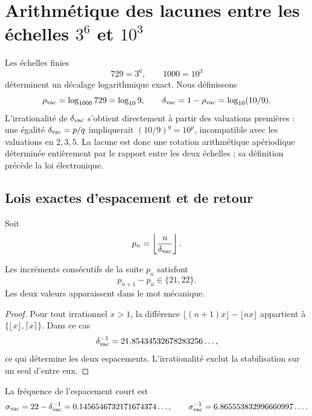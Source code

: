 \section{Arithmétique des lacunes entre les échelles \texorpdfstring{\(3^6\)}{3 élevé à 6} et \texorpdfstring{\(10^3\)}{10 élevé à 3}}
\label{sec:vacancias-corriente-electron-rev11}

Les échelles finies
\[
 729=3^6,
 \qquad
 1000=10^3
\]
déterminent un décalage logarithmique exact. Nous définissons
\begin{equation}
 \rho_{\rm vac}=\log_{1000}729=\log_{10}9,
 \qquad
 \delta_{\rm vac}=1-\rho_{\rm vac}=\log_{10}(10/9).
 \label{eq:delta-vacancias-rev11}
\end{equation}
L'irrationalité de \(\delta_{\rm vac}\) s'obtient directement à partir des
valuations premières : une égalité
\(\delta_{\rm vac}=p/q\) impliquerait
\((10/9)^q=10^p\), incompatible avec les valuations en \(2,3,5\).
La lacune est donc une rotation arithmétique apériodique déterminée
entièrement par le rapport entre les deux échelles ; sa définition précède
la loi électronique.

\subsection{Lois exactes d'espacement et de retour}

Soit
\[
 p_n=\left\lfloor\frac{n}{\delta_{\rm vac}}\right\rfloor.
\]

\begin{theorem}
\label{thm:ley-huecos-vacancias-rev11}
Les incréments consécutifs de la suite \(p_n\) satisfont
\[
 p_{n+1}-p_n\in\{21,22\}.
\]
Les deux valeurs apparaissent dans le mot mécanique.
\end{theorem}

\begin{proof}
Pour tout irrationnel \(x>1\), la différence
\(\lfloor(n+1)x\rfloor-\lfloor nx\rfloor\) appartient à
\(\{\lfloor x\rfloor,\lceil x\rceil\}\). Dans ce cas
\[
 \delta_{\rm vac}^{-1}
 =21.85434532678283256\ldots,
\]
ce qui détermine les deux espacements. L'irrationalité exclut la stabilisation
sur un seul d'entre eux.
\end{proof}

La fréquence de l'espacement court est
\[
 \sigma_{\rm vac}=22-\delta_{\rm vac}^{-1}
 =0.1456546732171674374\ldots,
 \qquad
 \sigma_{\rm vac}^{-1}=6.865553832996660997\ldots.
\]

